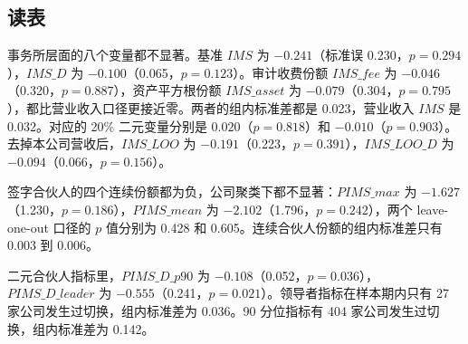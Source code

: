 \documentclass[11pt]{article}
\begin{document}
\subsection{读表}

事务所层面的八个变量都不显著。基准 \(IMS\) 为 \(-0.241\)（标准误 0.230，\(p=0.294\)），\(IMS\_D\) 为 \(-0.100\)（0.065，\(p=0.123\)）。审计收费份额 \(IMS\_fee\) 为 \(-0.046\)（0.320，\(p=0.887\)），资产平方根份额 \(IMS\_asset\) 为 \(-0.079\)（0.304，\(p=0.795\)），都比营业收入口径更接近零。两者的组内标准差都是 0.023，营业收入 \(IMS\) 是 0.032。对应的 20\% 二元变量分别是 \(0.020\)（\(p=0.818\)）和 \(-0.010\)（\(p=0.903\)）。去掉本公司营收后，\(IMS\_LOO\) 为 \(-0.191\)（0.223，\(p=0.391\)），\(IMS\_LOO\_D\) 为 \(-0.094\)（0.066，\(p=0.156\)）。

签字合伙人的四个连续份额都为负，公司聚类下都不显著：\(PIMS\_max\) 为 \(-1.627\)（1.230，\(p=0.186\)），\(PIMS\_mean\) 为 \(-2.102\)（1.796，\(p=0.242\)），两个 leave-one-out 口径的 \(p\) 值分别为 0.428 和 0.605。连续合伙人份额的组内标准差只有 0.003 到 0.006。

二元合伙人指标里，\(PIMS\_D\_p90\) 为 \(-0.108\)（0.052，\(p=0.036\)），\(PIMS\_D\_leader\) 为 \(-0.555\)（0.241，\(p=0.021\)）。领导者指标在样本期内只有 27 家公司发生过切换，组内标准差为 0.036。90 分位指标有 404 家公司发生过切换，组内标准差为 0.142。
\end{document}
